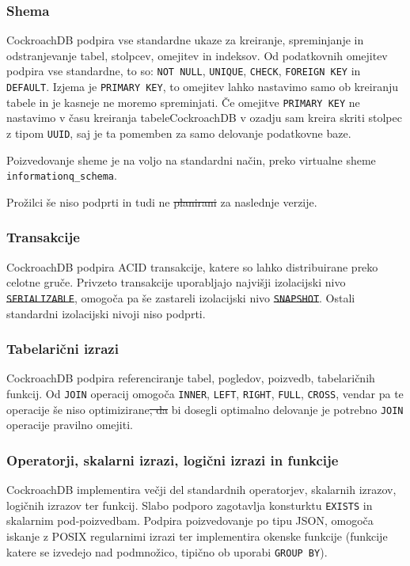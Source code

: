 \documentclass[a4paper, 12pt]{book}
\providecommand{\DIFaddtex}[1]{{\protect\color{blue}\uwave{#1}}} %
\providecommand{\DIFdeltex}[1]{{\protect\color{red}\sout{#1}}}                      %
\providecommand{\DIFaddbegin}{} %
\providecommand{\DIFaddend}{} %
\providecommand{\DIFdelbegin}{} %
\providecommand{\DIFdelend}{} %
\providecommand{\DIFadd}[1]{\texorpdfstring{\DIFaddtex{#1}}{#1}} %
\providecommand{\DIFdel}[1]{\texorpdfstring{\DIFdeltex{#1}}{}} %
\newcommand{\DIFscaledelfig}{0.5}
\newlength{\DIFdelgraphicswidth} %
\newlength{\DIFdelgraphicsheight} %
\newcommand{\DIFaddincludegraphics}[2][]{{\color{blue}\fbox{\DIFOincludegraphics[#1]{#2}}}} %
\newcommand{\DIFdelincludegraphics}[2][]{%
\sbox{\DIFdelgraphicsbox}{\DIFOincludegraphics[#1]{#2}}%
\settoboxwidth{\DIFdelgraphicswidth}{\DIFdelgraphicsbox} %
\settoboxtotalheight{\DIFdelgraphicsheight}{\DIFdelgraphicsbox} %
\scalebox{\DIFscaledelfig}{%
\parbox[b]{\DIFdelgraphicswidth}{\usebox{\DIFdelgraphicsbox}\\[-\baselineskip] \rule{\DIFdelgraphicswidth}{0em}}\llap{\resizebox{\DIFdelgraphicswidth}{\DIFdelgraphicsheight}{%
\setlength{\unitlength}{\DIFdelgraphicswidth}%
\begin{picture}(1,1)%
\thicklines\linethickness{2pt} %
{\color[rgb]{1,0,0}\put(0,0){\framebox(1,1){}}}%
{\color[rgb]{1,0,0}\put(0,0){\line( 1,1){1}}}%
{\color[rgb]{1,0,0}\put(0,1){\line(1,-1){1}}}%
\end{picture}%
}\hspace*{3pt}}} %
} %
\DeclareRobustCommand{\DIFaddbegin}{\DIFOaddbegin \let\includegraphics\DIFaddincludegraphics} %
\DeclareRobustCommand{\DIFaddend}{\DIFOaddend \let\includegraphics\DIFOincludegraphics} %
\DeclareRobustCommand{\DIFdelbegin}{\DIFOdelbegin \let\includegraphics\DIFdelincludegraphics} %
\DeclareRobustCommand{\DIFdelend}{\DIFOaddend \let\includegraphics\DIFOincludegraphics} %
\begin{document}
\subsubsection{Shema}
CockroachDB podpira vse standardne ukaze za kreiranje, spreminjanje in odstranjevanje tabel, stolpcev, omejitev in indeksov. Od podatkovnih omejitev podpira vse standardne, to so: \texttt{NOT NULL}, \texttt{UNIQUE}, \texttt{CHECK}, \texttt{FOREIGN KEY} in \texttt{DEFAULT}. Izjema je \texttt{PRIMARY KEY}, to omejitev lahko nastavimo samo ob kreiranju tabele in je kasneje ne moremo spreminjati. Če omejitve \texttt{PRIMARY KEY} ne nastavimo v času kreiranja tabele\DIFaddbegin \DIFadd{, }\DIFaddend CockroachDB v ozadju sam kreira skriti stolpec z tipom \texttt{UUID}, saj je ta pomemben za samo delovanje podatkovne baze.

Poizvedovanje sheme je na voljo na standardni način, preko virtualne sheme \texttt{informationq\_schema}.

Prožilci še niso podprti in tudi ne \DIFdelbegin \DIFdel{planirani }\DIFdelend \DIFaddbegin \DIFadd{načrtovani }\DIFaddend za naslednje verzije.

\subsubsection{Transakcije}
CockroachDB podpira ACID transakcije, katere so lahko distribuirane preko celotne gruče. Privzeto transakcije uporabljajo najvišji izolacijski nivo \texttt{\DIFdelbegin \DIFdel{SERIALIZABLE}\DIFdelend \DIFaddbegin \DIFadd{SE\-RI\-AL\-IZ\-ABLE}\DIFaddend }, omogoča pa še zastareli izolacijski nivo \texttt{\DIFdelbegin \DIFdel{SNAPSHOT}\DIFdelend \DIFaddbegin \DIFadd{SNAP\-SHOT}\DIFaddend }. Ostali standardni izolacijski nivoji niso podprti.

\subsubsection{Tabelarični izrazi}
CockroachDB podpira referenciranje tabel, pogledov, poizvedb, tabelaričnih funkcij. Od \texttt{JOIN} operacij omogoča \texttt{INNER}, \texttt{LEFT}, \texttt{RIGHT}, \texttt{FULL}, \texttt{CROSS}, vendar pa te operacije še niso optimizirane\DIFdelbegin \DIFdel{, da }\DIFdelend \DIFaddbegin \DIFadd{. Da }\DIFaddend bi dosegli optimalno delovanje je potrebno \texttt{JOIN} operacije pravilno omejiti.

\subsubsection{Operatorji, skalarni izrazi, logični izrazi in funkcije}
CockroachDB implementira večji del standardnih operatorjev, skalarnih izrazov, logičnih izrazov ter funkcij. Slabo podporo zagotavlja konsturktu \texttt{EXISTS} in skalarnim pod-poizvedbam. Podpira poizvedovanje po tipu JSON, omogoča iskanje z POSIX regularnimi izrazi ter implementira okenske funkcije (funkcije katere se izvedejo nad podmnožico, tipično ob uporabi \texttt{GROUP BY}).
\end{document}
